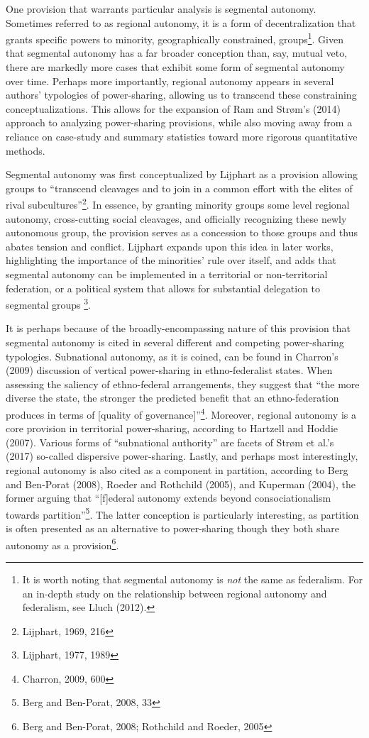 \documentclass[12pt]{article}
\begin{document}
One provision that warrants particular analysis is segmental autonomy. Sometimes referred to as regional autonomy, it is a form of decentralization that grants specific powers to minority, geographically constrained, groups\footnote{It is worth noting that segmental autonomy is \textit{not} the same as federalism. For an in-depth study on the relationship between regional autonomy and federalism, see Lluch (2012).}. Given that segmental autonomy has a far broader conception than, say, mutual veto, there are markedly more cases that exhibit some form of segmental autonomy over time. Perhaps more importantly, regional autonomy appears in several authors' typologies of power-sharing, allowing us to transcend these constraining conceptualizations. This allows for the expansion of Ram and Strøm’s (2014) approach to analyzing power-sharing provisions, while also moving away from a reliance on case-study and summary statistics toward more rigorous quantitative methods.

Segmental autonomy was first conceptualized by Lijphart as a provision allowing groups to “transcend cleavages and to join in a common effort with the elites of rival subcultures”\footnote{Lijphart, 1969, 216}. In essence, by granting minority groups some level regional autonomy, cross-cutting social cleavages, and officially recognizing these newly autonomous group, the provision serves as a concession to those groups and thus abates tension and conflict. Lijphart expands upon this idea in later works, highlighting the importance of the minorities’ rule over itself, and adds that segmental autonomy can be implemented in a territorial or non-territorial federation, or a political system that allows for substantial delegation to segmental groups \footnote{Lijphart, 1977, 1989}. 

It is perhaps because of the broadly-encompassing nature of this provision that segmental autonomy is cited in several different and competing power-sharing typologies. Subnational autonomy, as it is coined, can be found in Charron’s (2009) discussion of vertical power-sharing in ethno-federalist states. When assessing the saliency of ethno-federal arrangements, they suggest that “the more diverse the state, the stronger the predicted benefit that an ethno-federation produces in terms of [quality of governance]”\footnote{Charron, 2009, 600}. Moreover, regional autonomy is a core provision in territorial power-sharing, according to Hartzell and Hoddie (2007). Various forms of “subnational authority” are facets of Strøm et al.’s (2017) so-called dispersive power-sharing. Lastly, and perhaps most interestingly, regional autonomy is also cited as a component in partition, according to Berg and Ben-Porat (2008), Roeder and Rothchild (2005), and Kuperman (2004), the former arguing that “[f]ederal autonomy extends beyond consociationalism towards partition”\footnote{Berg and Ben-Porat, 2008, 33}. The latter conception is particularly interesting, as partition is often presented as an alternative to power-sharing though they both share autonomy as a provision\footnote{Berg and Ben-Porat, 2008; Rothchild and Roeder, 2005}. 
\end{document}
